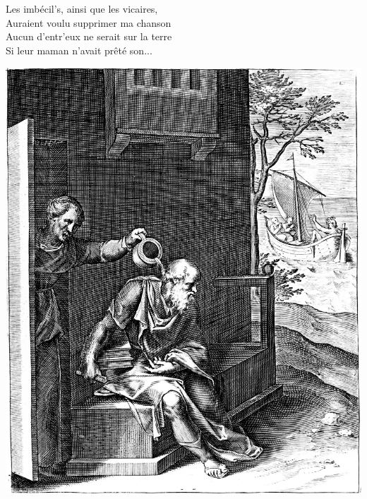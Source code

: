 \breakpage
\\\\Les imbécil's, ainsi que les vicaires,
\\Auraient voulu supprimer ma chanson
\\Aucun d'entr'eux ne serait sur la terre
\\Si leur maman n'avait prêté son...

\bigskip
\bigskip
\begin{center}
\includegraphics[width=1\textwidth]{images/brev44.png}
\end{center}

\breakpage